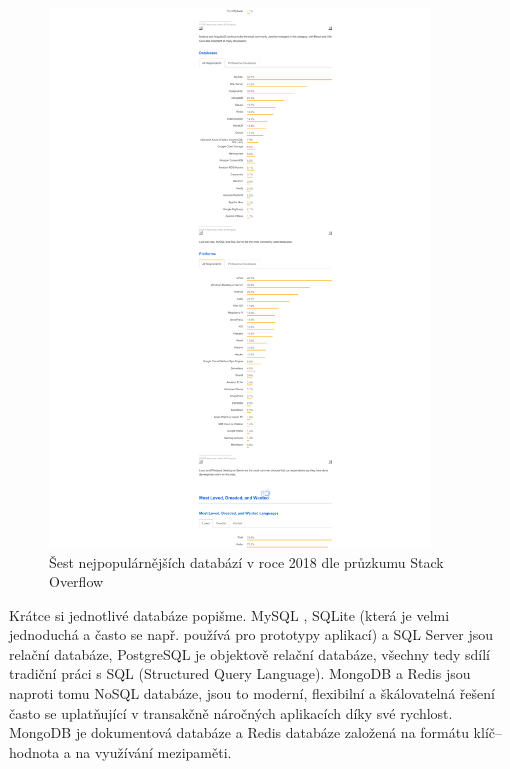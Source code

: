     \begin{figure}\centering
    	\includegraphics[width=0.9\textwidth]{img/stack-stats-db}
    	\caption[Popularita databází v roce 2018 dle průzkumu Stack Overflow]{Šest nejpopulárnějších databází v roce 2018 dle průzkumu Stack Overflow \cite{stack-stats18}}\label{fig:stack-stats18-db}
    \end{figure}
    
    Krátce si jednotlivé databáze popišme. MySQL \cite{db1}, SQLite \cite{db2} (která je velmi jednoduchá a často se např. používá pro prototypy aplikací) a SQL Server jsou relační databáze, PostgreSQL \cite{db3} je objektově relační databáze, všechny tedy sdílí tradiční práci s SQL (Structured Query Language). MongoDB \cite{db4} a Redis \cite{db5} jsou naproti tomu NoSQL databáze, jsou to moderní, flexibilní a škálovatelná řešení často se uplatňující v transakčně náročných aplikacích díky své rychlost. MongoDB je dokumentová databáze a Redis databáze založená na formátu klíč--hodnota a na využívání mezipaměti.
    
